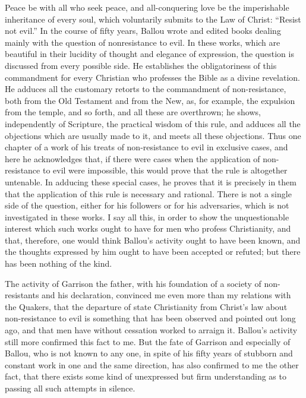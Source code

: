 \documentclass{book}
\begin{document}
Peace be with all who seek peace, and all-conquering love be the imperishable inheritance of every soul, which voluntarily submits to the Law of Christ: “Resist not evil.” In the course of fifty years, Ballou wrote and edited books dealing mainly with the question of nonresistance to evil. In these works, which are beautiful in their lucidity of thought and elegance of expression, the question is discussed from every possible side. He establishes the obligatoriness of this commandment for every Christian who professes the Bible as a divine revelation. He adduces all the customary retorts to the commandment of non-resistance, both from the Old Testament and from the New, as, for example, the expulsion from the temple, and so forth, and all these are overthrown; he shows, independently of Scripture, the practical wisdom of this rule, and adduces all the objections which are usually made to it, and meets all these objections. Thus one chapter of a work of his treats of non-resistance to evil in exclusive cases, and here he acknowledges that, if there were cases when the application of non-resistance to evil were impossible, this would prove that the rule is altogether untenable. In adducing these special cases, he proves that it is precisely in them that the application of this rule is necessary and rational. There is not a single side of the question, either for his followers or for his adversaries, which is not investigated in these works. I say all this, in order to show the unquestionable interest which such works ought to have for men who profess Christianity, and that, therefore, one would think Ballou’s activity ought to have been known, and the thoughts expressed by him ought to have been accepted or refuted; but there has been nothing of the kind.

The activity of Garrison the father, with his foundation of a society of non-resistants and his declaration, convinced me even more than my relations with the Quakers, that the departure of state Christianity from Christ’s law about non-resistance to evil is something that has been observed and pointed out long ago, and that men have without cessation worked to arraign it. Ballou’s activity still more confirmed this fact to me. But the fate of Garrison and especially of Ballou, who is not known to any one, in spite of his fifty years of stubborn and constant work in one and the same direction, has also confirmed to me the other fact, that there exists some kind of unexpressed but firm understanding as to passing all such attempts in silence.
\end{document}
